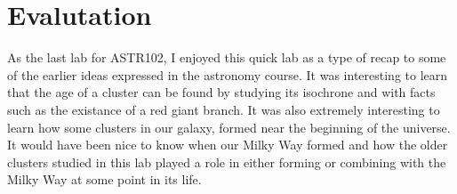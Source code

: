 \documentclass{article}
\begin{document}
\begin{enumerate}
\end{enumerate}




\section{Evalutation}

As the last lab for ASTR102, I enjoyed this quick lab as a type of recap to some
of the earlier ideas expressed in the astronomy course. It was interesting to learn
that the age of a cluster can be found by studying its isochrone and with facts such
as the existance of a red giant branch. It was also extremely interesting to learn
how some clusters in our galaxy, formed near the beginning of the universe. It would
have been nice to know when our Milky Way formed and how the older clusters studied
in this lab played a role in either forming or combining with the Milky Way at some
point in its life.
\end{document}
